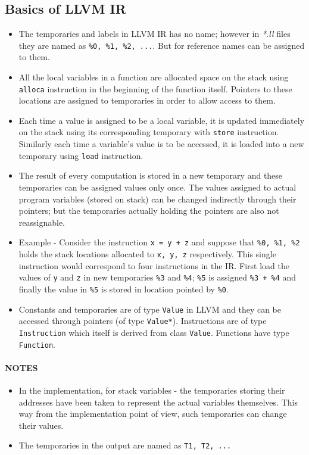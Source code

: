 \subsection{Basics of LLVM IR}
\label{subsec:BasicsOfLlvmIr}
\begin{itemize} \tightlist
    \item The temporaries and labels in LLVM IR has no name; however in \textit{*.ll} files they are named as \texttt{\%0, \%1, \%2, ...}. But for reference names can be assigned to them.
    \item All the local variables in a function are allocated space on the stack using \texttt{alloca} instruction in the beginning of the function itself. Pointers to these locations are assigned to temporaries in order to allow access to them.
    \item Each time a value is assigned to be a local variable, it is updated immediately on the stack using its corresponding temporary with \texttt{store} instruction. Similarly each time a variable's value is to be accessed, it is loaded into a new temporary using \texttt{load} instruction.
    \item The result of every computation is stored in a new temporary and these temporaries can be assigned values only once. The values assigned to actual program variables (stored on stack) can be changed indirectly through their pointers; but the temporaries actually holding the pointers are also not reassignable.
    \item Example - Consider the instruction \texttt{x = y + z} and suppose that \texttt{\%0, \%1, \%2} holds the stack locations allocated to \texttt{x, y, z} respectively. This single instruction would correspond to four instructions in the IR. First load the values of \texttt{y} and \texttt{z} in new temporaries \texttt{\%3} and \texttt{\%4}; \texttt{\%5} is assigned \texttt{\%3 + \%4} and finally the value in \texttt{\%5} is stored in location pointed by \texttt{\%0}.
    \item Constants and temporaries are of type \texttt{Value} in LLVM and they can be accessed through pointers (of type \texttt{Value*}). Instructions are of type \texttt{Instruction} which itself is derived from class \texttt{Value}. Functions have type \texttt{Function}.
\end{itemize}

\paragraph{NOTES} 
\begin{itemize}
    \item In the implementation, for stack variables - the temporaries storing their addresses have been taken to represent the actual variables themselves. This way from the implementation point of view, such temporaries can change their values.
    \item The temporaries in the output are named as \texttt{T1, T2, ...}
\end{itemize}

